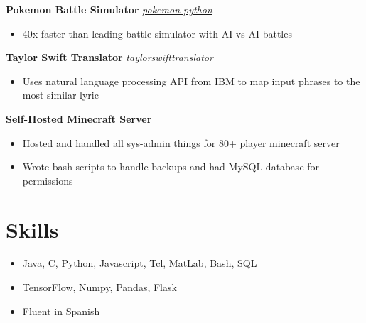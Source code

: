 \documentclass[10pt,letterpaper]{article}
\begin{document}
\textbf{Pokemon Battle Simulator} \hfill {} \href{https://github.com/nicolaslindbloomairey/pokemon-python}{\textit{pokemon-python}}
\begin{itemize}
    \item 40x faster than leading battle simulator with AI vs AI battles
\end{itemize}

\textbf{Taylor Swift Translator} \hfill {} \href{https://github.com/nicolaslindbloomairey/taylorswifttranslator}{\textit{taylorswifttranslator}}
\begin{itemize}
    \item Uses natural language processing API from IBM to map input phrases to the most similar lyric
\end{itemize}

\textbf{Self-Hosted Minecraft Server}
\begin{itemize}
    \item Hosted and handled all sys-admin things for 80+ player minecraft server
    \item Wrote bash scripts to handle backups and had MySQL database for permissions
\end{itemize}

\section*{Skills} \hrulefill 
\begin{itemize}
    \item Java, C, Python, Javascript, Tcl, MatLab, Bash, SQL
    \item TensorFlow, Numpy, Pandas, Flask
    \item Fluent in Spanish
\end{itemize}
\end{document}
